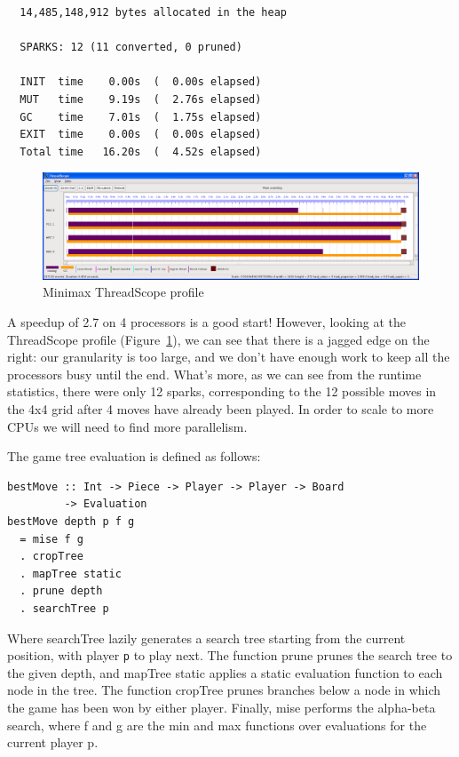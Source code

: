 \documentclass[twocolumn,9pt]{sigplanconf}
\newcommand{\codef}[1]{{\fontfamily{cmss}\small#1}}
\begin{document}
\begin{verbatim}
  14,485,148,912 bytes allocated in the heap

  SPARKS: 12 (11 converted, 0 pruned)

  INIT  time    0.00s  (  0.00s elapsed)
  MUT   time    9.19s  (  2.76s elapsed)
  GC    time    7.01s  (  1.75s elapsed)
  EXIT  time    0.00s  (  0.00s elapsed)
  Total time   16.20s  (  4.52s elapsed)
\end{verbatim}

\begin{figure}
\begin{center}
\includegraphics[scale=0.3]{minimax1.png}
\end{center}
\caption{Minimax ThreadScope profile}
\label{f:minimax-threadscope1}
\end{figure}

A speedup of 2.7 on 4 processors is a good start!  However, looking at
the ThreadScope profile (Figure~\ref{f:minimax-threadscope1}), we can
see that there is a jagged edge on the right: our granularity is too
large, and we don't have enough work to keep all the processors busy
until the end.  What's more, as we can see from the runtime
statistics, there were only 12 sparks, corresponding to the 12
possible moves in the 4x4 grid after 4 moves have already been played.
In order to scale to more CPUs we will need to find more parallelism.

The game tree evaluation is defined as follows:

\begin{lstlisting}[columns=flexible]
bestMove :: Int -> Piece -> Player -> Player -> Board
         -> Evaluation
bestMove depth p f g 
  = mise f g 
  . cropTree
  . mapTree static
  . prune depth
  . searchTree p
\end{lstlisting}

Where \codef{searchTree} lazily generates a search tree starting
from the current position, with player \texttt{p} to play next.  The
function \codef{prune} prunes the search tree to the given depth, and
\codef{mapTree static} applies a static evaluation function to each
node in the tree.  The function \codef{cropTree} prunes branches below
a node in which the game has been won by either player.  Finally,
\codef{mise} performs the alpha-beta search, where \codef{f} and
\codef{g} are the min and max functions over evaluations for the
current player \codef{p}.
\end{document}
